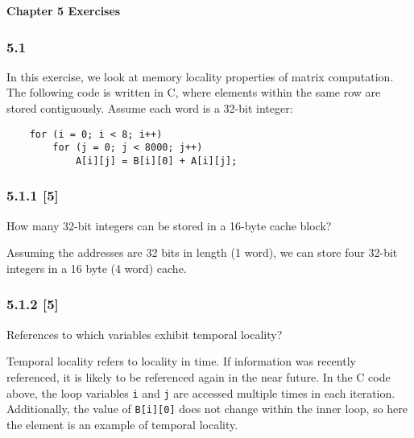 \documentclass[fleqn]{article}
\begin{document}
\pagestyle{fancy}
\fancyhead{}
\fancyhead[R]{\thepage}
\fancyfoot{}

\begin{center}
    \Large{\textbf{Chapter 5 Exercises}}\\
\end{center}
\vspace{0.25in}

\subsubsection*{5.1} In this exercise, we look at memory locality properties of matrix computation. The following code is written in C, where elements within the same row are stored contiguously. Assume each word is a 32-bit integer:
\begin{verbatim}
    for (i = 0; i < 8; i++)  
        for (j = 0; j < 8000; j++)  
            A[i][j] = B[i][0] + A[i][j]; 
\end{verbatim}

\subsubsection*{5.1.1 [5] \textrangle} How many 32-bit integers can be stored in a 16-byte cache block?
\begin{addmargin}[0.15cm]{0cm}
   Assuming the addresses are 32 bits in length (1 word), we can store four 32-bit integers in a 16 byte (4 word) cache.
\end{addmargin}
\subsubsection*{5.1.2 [5] \textrangle} References to which variables exhibit temporal locality?
\begin{addmargin}[0.15cm]{0cm}
    Temporal locality refers to locality in time. If information was recently referenced, it is likely to be referenced again in the near future. In the C code above, the loop variables \verb|i| and \verb|j| are accessed multiple times in each iteration. Additionally, the value of \verb|B[i][0]| does not change within the inner loop, so here the element is an example of temporal locality.
\end{addmargin}
\end{document}
